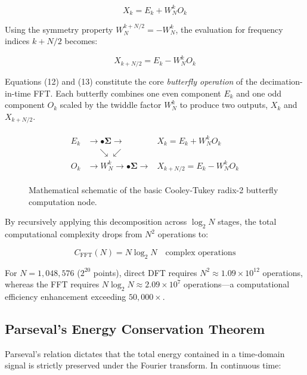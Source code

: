 \documentclass[11pt,a4paper]{article}
\begin{document}
\begin{equation}
X_k = E_k + W_N^k O_k
\end{equation}

Using the symmetry property $W_N^{k + N/2} = -W_N^k$, the evaluation for frequency indices $k + N/2$ becomes:

\begin{equation}
X_{k + N/2} = E_k - W_N^k O_k
\end{equation}

Equations (12) and (13) constitute the core \emph{butterfly operation} of the decimation-in-time FFT. Each butterfly combines one even component $E_k$ and one odd component $O_k$ scaled by the twiddle factor $W_N^k$ to produce two outputs, $X_k$ and $X_{k + N/2}$.

\begin{figure}[h!]
\centering
\begin{align*}
\begin{array}{ccl}
E_k & \longrightarrow \bullet \mathbf{\Sigma} \longrightarrow & X_k = E_k + W_N^k O_k \\
    & \quad \ \searrow \!\! \swarrow & \\
O_k & \longrightarrow W_N^k \rightarrow \bullet \mathbf{\Sigma} \longrightarrow & X_{k + N/2} = E_k - W_N^k O_k
\end{array}
\end{align*}
\caption{Mathematical schematic of the basic Cooley-Tukey radix-2 butterfly computation node.}
\label{fig:butterfly}
\end{figure}

By recursively applying this decomposition across $\log_2 N$ stages, the total computational complexity drops from $N^2$ operations to:

\begin{equation}
C_{\text{FFT}}(N) = N \log_2 N \quad \text{complex operations}
\end{equation}

For $N = 1,048,576$ ($2^{20}$ points), direct DFT requires $N^2 \approx 1.09 \times 10^{12}$ operations, whereas the FFT requires $N \log_2 N \approx 2.09 \times 10^7$ operations—a computational efficiency enhancement exceeding $50,000\times$.

\subsection{Parseval's Energy Conservation Theorem}

Parseval's relation dictates that the total energy contained in a time-domain signal is strictly preserved under the Fourier transform. In continuous time:
\end{document}
